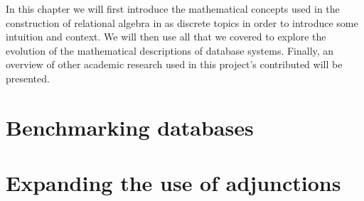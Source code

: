 In this chapter we will first introduce the mathematical concepts used in the construction of relational algebra in \cite{RelationalAlgebraByWayOfAdjunctions} as discrete topics in order to introduce some intuition and context. We will then use all that we covered to explore the evolution of the mathematical descriptions of database systems. Finally, an overview of other academic research used in this project's contributed will be presented.





\section{Benchmarking databases}\label{sec:benchmarking}
\section{Expanding the use of adjunctions}